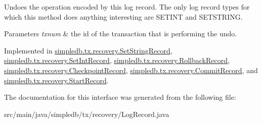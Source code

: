 Undoes the operation encoded by this log record. The only log record types for which this method does anything interesting are S\+E\+T\+I\+NT and S\+E\+T\+S\+T\+R\+I\+NG. 
\begin{DoxyParams}{Parameters}
{\em txnum} & the id of the transaction that is performing the undo. \\
\hline
\end{DoxyParams}


Implemented in \hyperlink{classsimpledb_1_1tx_1_1recovery_1_1SetStringRecord_a34e8c9a212d3dfcd8f36774271d8cb38}{simpledb.\+tx.\+recovery.\+Set\+String\+Record}, \hyperlink{classsimpledb_1_1tx_1_1recovery_1_1SetIntRecord_a917897bef9acb164bed44eb6655f6835}{simpledb.\+tx.\+recovery.\+Set\+Int\+Record}, \hyperlink{classsimpledb_1_1tx_1_1recovery_1_1RollbackRecord_ad21d99845cfc0eaafe7ffdb01f8dae70}{simpledb.\+tx.\+recovery.\+Rollback\+Record}, \hyperlink{classsimpledb_1_1tx_1_1recovery_1_1CheckpointRecord_a4972aad5462b30acfd987cf21b3fc7c2}{simpledb.\+tx.\+recovery.\+Checkpoint\+Record}, \hyperlink{classsimpledb_1_1tx_1_1recovery_1_1CommitRecord_aa7a60156e7d7dfb10d2e6f8e4496f756}{simpledb.\+tx.\+recovery.\+Commit\+Record}, and \hyperlink{classsimpledb_1_1tx_1_1recovery_1_1StartRecord_af33d26ca2032ba63cc06f266e9c41efa}{simpledb.\+tx.\+recovery.\+Start\+Record}.



The documentation for this interface was generated from the following file\+:\begin{DoxyCompactItemize}
\item 
src/main/java/simpledb/tx/recovery/Log\+Record.\+java\end{DoxyCompactItemize}
